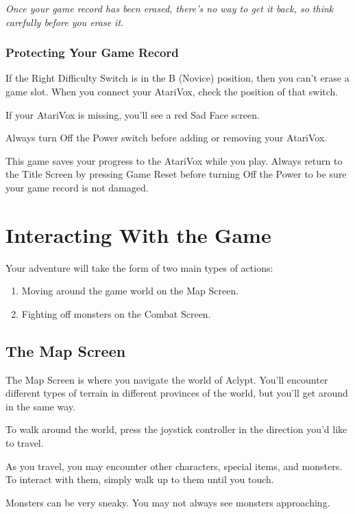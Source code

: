\documentclass[10pt,twoside,openright]{memoir}
\begin{document}
\emph{Once your  game record has been  erased, there's no way  to get it
  back, so think carefully before you erase it.}

\subsection{Protecting Your Game Record}

If the Right  Difficulty Switch is in the B  (Novice) position, then you
can't  erase a  game slot.  When you  connect your  AtariVox, check  the
position of that switch.

If your AtariVox is missing, you'll see a red Sad Face screen.

Always   turn  Off   the  Power   switch  before   adding  or   removing
your AtariVox.

This game saves your progress to the AtariVox while you play.  Always
return to the Title Screen by pressing Game Reset before turning Off
the Power to be sure your game record is not damaged.


\chapter{Interacting With the Game}

Your adventure will take the form of two main types of actions:

\begin{enumerate}
\item Moving around the game world on the Map Screen.
\item Fighting off monsters on the Combat Screen.
\end{enumerate}

\section{The Map Screen}

The Map Screen is where you navigate the world of Aclypt. You'll
encounter different types of terrain in different provinces of the
world, but you'll get around in the same way.

To walk around the world, press the joystick controller in the
direction you'd like to travel.

As you travel, you may encounter other characters, special items, and
monsters. To interact with them, simply walk up to them until you
touch.

Monsters can be very sneaky. You may not always see monsters
approaching.
\end{document}
